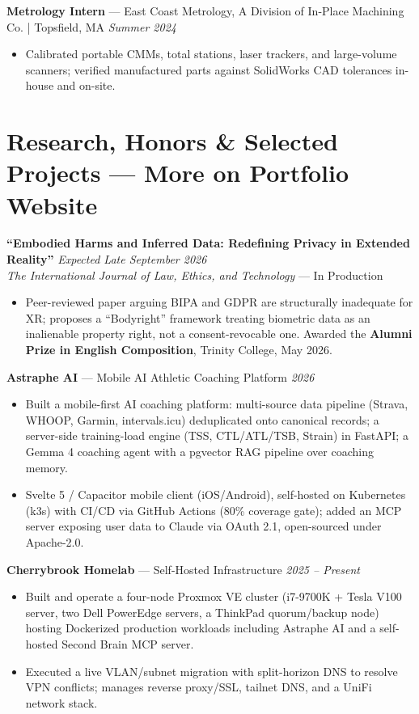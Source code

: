 \documentclass[10pt, letterpaper]{article}
\begin{document}
\vspace{1pt}\noindent
\textbf{Metrology Intern} --- East Coast Metrology, A Division of In-Place Machining Co. | Topsfield, MA
\hfill \textit{Summer 2024}
\begin{itemize}
  \item Calibrated portable CMMs, total stations, laser trackers, and large-volume scanners;
    verified manufactured parts against SolidWorks CAD tolerances in-house and on-site.
\end{itemize}

\section{Research, Honors \& Selected Projects --- More on Portfolio Website}

\noindent
\textbf{``Embodied Harms and Inferred Data: Redefining Privacy in Extended Reality''}
\hfill \textit{Expected Late September 2026}\\
\textit{The International Journal of Law, Ethics, and Technology} --- In Production
\begin{itemize}
  \item Peer-reviewed paper arguing BIPA and GDPR are structurally inadequate for XR;
    proposes a ``Bodyright'' framework treating biometric data as an inalienable property
    right, not a consent-revocable one. Awarded the \textbf{Alumni Prize in English
    Composition}, Trinity College, May 2026.
\end{itemize}

\vspace{1pt}\noindent
\textbf{Astraphe AI} --- Mobile AI Athletic Coaching Platform
\hfill \textit{2026}
\begin{itemize}
  \item Built a mobile-first AI coaching platform: multi-source data pipeline (Strava,
    WHOOP, Garmin, intervals.icu) deduplicated onto canonical records; a server-side
    training-load engine (TSS, CTL/ATL/TSB, Strain) in FastAPI; a Gemma 4 coaching
    agent with a pgvector RAG pipeline over coaching memory.
  \item Svelte 5 / Capacitor mobile client (iOS/Android), self-hosted on Kubernetes (k3s)
    with CI/CD via GitHub Actions (80\% coverage gate); added an MCP server exposing user
    data to Claude via OAuth 2.1, open-sourced under Apache-2.0.
\end{itemize}

\vspace{1pt}\noindent
\textbf{Cherrybrook Homelab} --- Self-Hosted Infrastructure
\hfill \textit{2025 -- Present}
\begin{itemize}
  \item Built and operate a four-node Proxmox VE cluster (i7-9700K + Tesla V100 server, two
    Dell PowerEdge servers, a ThinkPad quorum/backup node) hosting Dockerized production
    workloads including Astraphe AI and a self-hosted Second Brain MCP server.
  \item Executed a live VLAN/subnet migration with split-horizon DNS to resolve VPN
    conflicts; manages reverse proxy/SSL, tailnet DNS, and a UniFi network stack.
\end{itemize}
\end{document}
